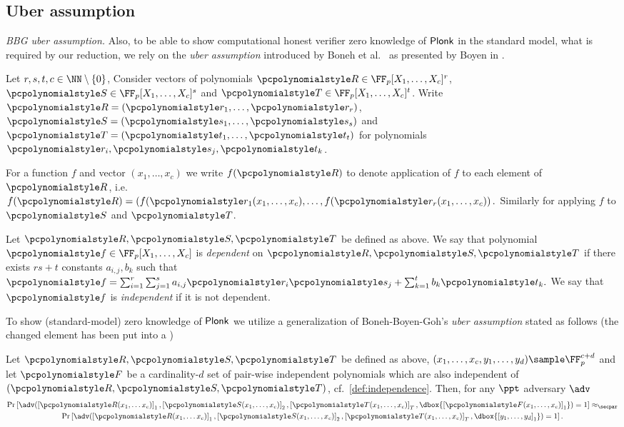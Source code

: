 \documentclass[runningheads,11pt]{llncs}
\newcommand\dboxed[1]{\dbox{\ensuremath{#1}}}
\newcommand{\ourpar}[1] {\smallskip\noindent\emph{#1}}
\begin{document}
\subsection{Uber assumption}
\label{sec:uber_assumption}
\ourpar{BBG uber assumption.}
Also, to be able to show computational honest verifier zero knowledge of
$\textnormal{\textsf{Plonk}}$ in the standard model, what is required by our reduction, we rely on the
\emph{uber assumption} introduced by Boneh et
al.~\cite{EC:BonBoyGoh05} as presented by Boyen in \cite{PAIRING:Boyen08}.

Let $r, s, t, c \in \NN \setminus \smallset{0}$, Consider vectors of polynomials
$\pR \in \FF_p[X_1, \ldots, X_c]^r$, $\pS \in \FF_p[X_1, \ldots, X_c]^s$ and
$\pT \in \FF_p[X_1, \ldots, X_c]^t$. Write $\pR = \left( \p{r}_1, \ldots,
  \p{r}_r \right)$, $\pS = \left( \p{s}_1, \ldots, \p{s}_s \right)$ and $\pT =
\left( \p{t}_1, \ldots, \p{t}_t \right)$ for polynomials $\p{r}_i, \p{s}_j,
\p{t}_k$.

For a function $f$ and vector $(x_1, \ldots, x_c)$ we write $f(\pR)$ to
denote application of $f$ to each element of $\pR$, i.e.
\(
	f(\pR) = \left( f(\p{r}_1 (x_1, \ldots, x_c), \ldots, f(\p{r}_r
	(x_1, \ldots, x_c) \right).
\)
Similarly for applying $f$ to $\pS$ and $\pT$.

\begin{definition}[Independence of $\pR, \pS, \pT$]
	\label{def:independence}
	Let $\pR, \pS, \pT$ be defined as above. We say that polynomial $\p{f} \in
  \FF_p[X_1, \ldots, X_c]$ is \emph{dependent} on $\pR, \pS, \pT$ if there
  exists $rs + t$ constants $a_{i, j}, b_k$ such that $ \p{f} = \sum_{i = 1}^{r}
  \sum_{j = 1}^{s} a_{i, j} \p{r}_i \p{s}_j + \sum_{k = 1}^{t} b_k \p{t}_k. $ We
  say that $\p{f}$ is \emph{independent} if it is not dependent.
\end{definition}

To show (standard-model) zero knowledge of $\textnormal{\textsf{Plonk}}$ we utilize a generalization
of Boneh-Boyen-Goh's \emph{uber assumption} \cite{EC:BonBoyGoh05} stated as
follows (the changed element has been put into a )
\begin{definition}
	\label{def:uber_assumption}
	Let $\pR, \pS, \pT$ be defined as above,
    $(x_1, \ldots, x_c, y_1, \ldots, y_{d}) \sample \FF_p^{c + d}$ and let
    $\p{F}$ be a cardinality-$d$ set of pair-wise independent polynomials which are also
    independent of $(\pR, \pS, \pT)$, cf.~\cref{def:independence}.  Then, for
    any $\ppt$ adversary $\adv$
	\begin{multline*}
      \Pr\left[\adv(\gone{\pR(x_1, \ldots x_c)}, \gtwo{\pS(x_1, \ldots, x_c)},
		\gtar{\pT(x_1, \ldots, x_c)}, \dboxed{\gone{\p{F}(x_1, \ldots, x_c)}}) = 1\right] \approx_\secpar \\
      \Pr\left[\adv(\gone{\pR(x_1, \ldots x_c)}, \gtwo{\pS(x_1, \ldots, x_c)},
        \gtar{\pT(x_1, \ldots, x_c)}, \dboxed{\gone{y_1, \ldots, y_{d}}}) =
        1\right].
	\end{multline*}
  \end{definition}
\end{document}
